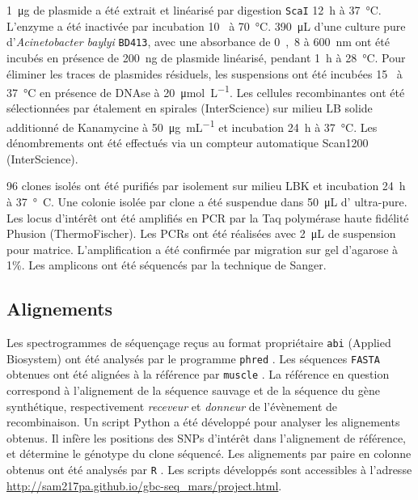 \si{1\ug} de plasmide a été extrait et linéarisé par digestion \texttt{ScaI}
\si{12\hour} à \si{37\celsius}. L'enzyme a été inactivée par incubation
\si{10\min} à \si{70\celsius}. \si{390\uL} d'une culture pure
d'\emph{Acinetobacter baylyi} \texttt{BD413}, avec une absorbance de \si{0,8} à
\si{600\nm} ont été incubés en présence de \si{200\ng} de plasmide linéarisé,
pendant \si{1\hour} à \si{28\celsius}. Pour éliminer les traces de plasmides
résiduels, les suspensions ont été incubées \si{15\min} à \si{37\celsius} en
présence de DNAse à \SI{20}{\umol\per\L}. Les cellules recombinantes ont été
sélectionnées par étalement en spirales (InterScience) sur milieu LB solide
additionné de Kanamycine à \SI{50}{\ug\per\mL} et incubation \SI{24}{\hour} à
\SI{37}{\celsius}. Les dénombrements ont été effectués via un compteur
automatique Scan\textsuperscript{\textregistered}1200 (InterScience).

96 clones isolés ont été purifiés par isolement sur milieu LBK et incubation
\SI{24}{\hour} à \si{37°C}. Une colonie isolée par clone a été suspendue dans
\SI{50}{\uL} d' ultra-pure. Les locus d'intérêt ont été amplifiés en
PCR par la Taq polymérase haute fidélité Phusion (ThermoFischer). Les PCRs ont
été réalisées avec \SI{2}{\uL} de suspension pour matrice. L'amplification a été
confirmée par migration sur gel d'agarose à 1\%. Les amplicons ont été séquencés
par la technique de Sanger.

\subsection{Alignements}
\label{subsec:align}

Les spectrogrammes de séquençage reçus au format propriétaire \texttt{abi}
(Applied Biosystem) ont été analysés par le programme \texttt{phred}
. Les séquences \texttt{FASTA} obtenues ont été alignées à la référence par
\texttt{muscle}
. La référence en question correspond à l'alignement de la séquence sauvage et
de la séquence du gène synthétique, respectivement \emph{receveur} et
\emph{donneur} de l'évènement de recombinaison. Un script Python
a été développé pour analyser les alignements obtenus. Il infère les positions
des SNPs d'intérêt dans l'alignement de référence, et détermine le génotype du
clone séquencé. Les alignements par paire en colonne obtenus ont été analysés
par \texttt{R}
. Les scripts développés sont accessibles à l'adresse
\url{http://sam217pa.github.io/gbc-seq_mars/project.html}.